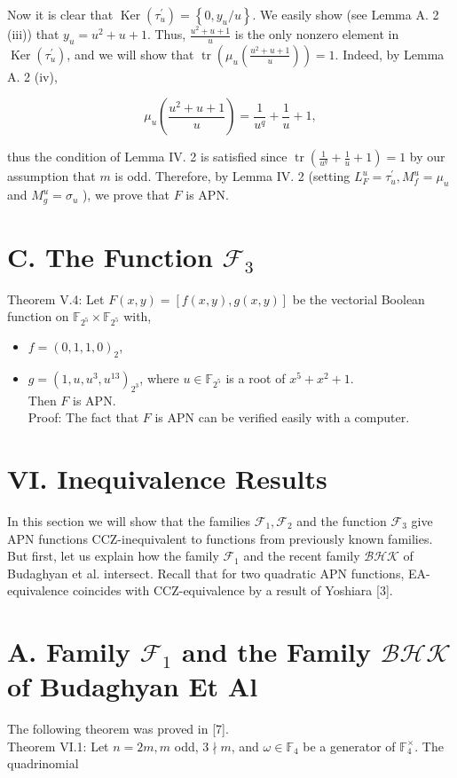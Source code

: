 \documentclass[10pt]{article}
\begin{document}
Now it is clear that $\operatorname{Ker}\left(\tau_{u}^{\prime}\right)=\left\{0, y_{u} / u\right\}$. We easily show (see Lemma A. 2 (iii)) that $y_{u}=u^{2}+u+1$. Thus, $\frac{u^{2}+u+1}{u}$ is the only nonzero element in $\operatorname{Ker}\left(\tau_{u}^{\prime}\right)$, and we will show that $\operatorname{tr}\left(\mu_{u}\left(\frac{u^{2}+u+1}{u}\right)\right)=1$. Indeed, by Lemma A. 2 (iv),

$$
\mu_{u}\left(\frac{u^{2}+u+1}{u}\right)=\frac{1}{u^{q}}+\frac{1}{u}+1,
$$

thus the condition of Lemma IV. 2 is satisfied since $\operatorname{tr}\left(\frac{1}{u^{q}}+\frac{1}{u}+1\right)=1$ by our assumption that $m$ is odd. Therefore, by Lemma IV. 2 (setting $L_{F}^{u}=\tau_{u}^{\prime}, M_{f}^{u}=\mu_{u}$ and $M_{g}^{u}=\sigma_{u}$ ), we prove that $F$ is APN.

\section*{C. The Function $\mathcal{F}_{3}$}
Theorem V.4: Let $F(x, y)=[f(x, y), g(x, y)]$ be the vectorial Boolean function on $\mathbb{F}_{2^{5}} \times \mathbb{F}_{2^{5}}$ with,

\begin{itemize}
  \item $f=(0,1,1,0)_{2}$,
  \item $g=\left(1, u, u^{3}, u^{13}\right)_{2^{3}}$, where $u \in \mathbb{F}_{2^{5}}$ is a root of $x^{5}+x^{2}+1$.\\
Then $F$ is APN.\\
Proof: The fact that $F$ is APN can be verified easily with a computer.
\end{itemize}

\section*{VI. Inequivalence Results}
In this section we will show that the families $\mathcal{F}_{1}, \mathcal{F}_{2}$ and the function $\mathcal{F}_{3}$ give APN functions CCZ-inequivalent to functions from previously known families. But first, let us explain how the family $\mathcal{F}_{1}$ and the recent family $\mathcal{B} \mathcal{H} \mathcal{K}$ of Budaghyan et al. intersect. Recall that for two quadratic APN functions, EA-equivalence coincides with CCZ-equivalence by a result of Yoshiara [3].

\section*{A. Family $\mathcal{F}_{1}$ and the Family $\mathcal{B} \mathcal{H} \mathcal{K}$ of Budaghyan Et Al}
The following theorem was proved in [7].\\
Theorem VI.1: Let $n=2 m, m$ odd, $3 \nmid m$, and $\omega \in \mathbb{F}_{4}$ be a generator of $\mathbb{F}_{4}^{\times}$. The quadrinomial
\end{document}
